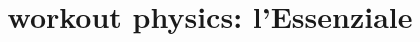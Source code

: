 \documentclass[oneside,20pt,fleqn,extrafontsizes]{memoir}
\title{workout physics: l'Essenziale}
\begin{document}
\pagestyle{mystyle}%
\renewcommand*{\contentsname}{\label{toc}{Table of Contents}}%
\maketitle
\listoftodos
\tableofcontents*

\end{document}
